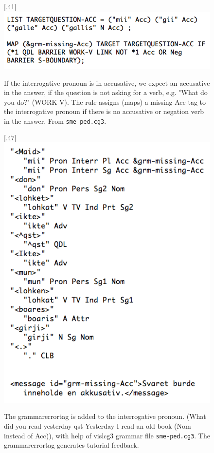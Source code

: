 \documentclass[11pt]{article}
\begin{document}
\begin{figure}[htbp]
\begin{center}
\scalebox{.41}[.41]{\includegraphics{presentation/img/pedcg3ny.png}}
\caption{If the interrogative pronoun is in accusative, we expect an accusative in the answer, if the question is not asking for a verb, e.g. "What do you do?" (WORK-V). The rule assigns (maps) a missing-Acc-tag to the interrogative pronoun if there is no accusative or negation verb in the answer. From \texttt{sme-ped.cg3}.}
\label{cg3}
\end{center}
\end{figure}

\begin{figure}[htbp]
\begin{center}
\scalebox{.47}[.47]{\includegraphics{presentation/img/vasta_feedback.png}}
\caption{The grammarerrortag is added to the interrogative pronoun. (What did you read yesterday qst Yesterday I read an old book (Nom instead of Acc)), with help of vislcg3 grammar file \texttt{sme-ped.cg3}. The grammarerrortag generates tutorial feedback.}
\label{maidlohket}
\end{center}
\end{figure}
\end{document}
